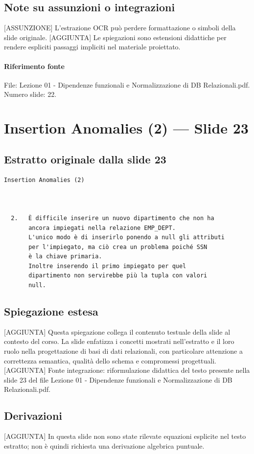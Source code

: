 \documentclass[11pt]{article}
\begin{document}
\subsection*{Note su assunzioni o integrazioni}
[ASSUNZIONE] L'estrazione OCR può perdere formattazione o simboli della slide originale.
[AGGIUNTA] Le spiegazioni sono estensioni didattiche per rendere espliciti passaggi impliciti nel materiale proiettato.
\paragraph{Riferimento fonte} File: Lezione 01 - Dipendenze funzionali e Normalizzazione di DB Relazionali.pdf. Numero slide: 22.
\section{Insertion Anomalies (2) --- Slide 23}
\subsection*{Estratto originale dalla slide 23}
\begin{lstlisting}
Insertion Anomalies (2)



  2.   È difficile inserire un nuovo dipartimento che non ha
       ancora impiegati nella relazione EMP_DEPT.
       L'unico modo è di inserirlo ponendo a null gli attributi
       per l'impiegato, ma ciò crea un problema poiché SSN
       è la chiave primaria.
       Inoltre inserendo il primo impiegato per quel
       dipartimento non servirebbe più la tupla con valori
       null.
\end{lstlisting}
\subsection*{Spiegazione estesa}
[AGGIUNTA] Questa spiegazione collega il contenuto testuale della slide al contesto del corso. La slide enfatizza i concetti mostrati nell'estratto e il loro ruolo nella progettazione di basi di dati relazionali, con particolare attenzione a correttezza semantica, qualità dello schema e compromessi progettuali.
[AGGIUNTA] Fonte integrazione: riformulazione didattica del testo presente nella slide 23 del file Lezione 01 - Dipendenze funzionali e Normalizzazione di DB Relazionali.pdf.
\subsection*{Derivazioni}
[AGGIUNTA] In questa slide non sono state rilevate equazioni esplicite nel testo estratto; non è quindi richiesta una derivazione algebrica puntuale.
\end{document}
